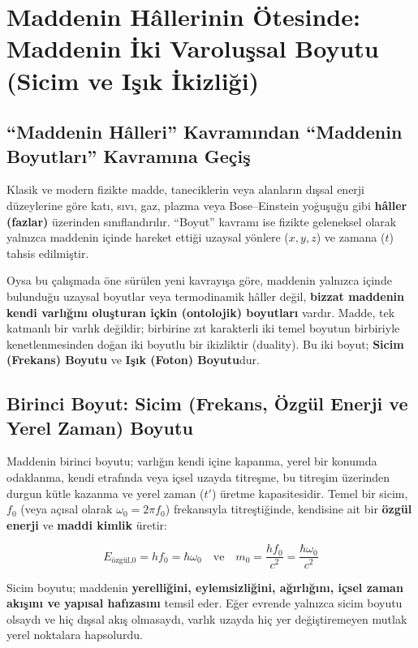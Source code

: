 \documentclass[12pt,a4paper]{article}
\begin{document}
\section{Maddenin Hâllerinin Ötesinde: Maddenin İki Varoluşsal Boyutu (Sicim ve Işık İkizliği)}

\subsection{``Maddenin Hâlleri'' Kavramından ``Maddenin Boyutları'' Kavramına Geçiş}

Klasik ve modern fizikte madde, taneciklerin veya alanların dışsal enerji düzeylerine göre katı, sıvı, gaz, plazma veya Bose--Einstein yoğuşuğu gibi \textbf{hâller (fazlar)} üzerinden sınıflandırılır. ``Boyut'' kavramı ise fizikte geleneksel olarak yalnızca maddenin içinde hareket ettiği uzaysal yönlere ($x, y, z$) ve zamana ($t$) tahsis edilmiştir.

Oysa bu çalışmada öne sürülen yeni kavrayışa göre, maddenin yalnızca içinde bulunduğu uzaysal boyutlar veya termodinamik hâller değil, \textbf{bizzat maddenin kendi varlığını oluşturan içkin (ontolojik) boyutları} vardır. Madde, tek katmanlı bir varlık değildir; birbirine zıt karakterli iki temel boyutun birbiriyle kenetlenmesinden doğan iki boyutlu bir ikizliktir (duality). Bu iki boyut; \textbf{Sicim (Frekans) Boyutu} ve \textbf{Işık (Foton) Boyutu}dur.

\subsection{Birinci Boyut: Sicim (Frekans, Özgül Enerji ve Yerel Zaman) Boyutu}

Maddenin birinci boyutu; varlığın kendi içine kapanma, yerel bir konumda odaklanma, kendi etrafında veya içsel uzayda titreşme, bu titreşim üzerinden durgun kütle kazanma ve yerel zaman ($t'$) üretme kapasitesidir. Temel bir sicim, $f_0$ (veya açısal olarak $\omega_0 = 2\pi f_0$) frekansıyla titreştiğinde, kendisine ait bir \textbf{özgül enerji} ve \textbf{maddi kimlik} üretir:

\begin{equation}
E_{\text{özgül,0}} = h f_0 = \hbar \omega_0 \quad \text{ve} \quad m_0 = \frac{h f_0}{c^2} = \frac{\hbar \omega_0}{c^2}
\end{equation}

Sicim boyutu; maddenin \textbf{yerelliğini, eylemsizliğini, ağırlığını, içsel zaman akışını ve yapısal hafızasını} temsil eder. Eğer evrende yalnızca sicim boyutu olsaydı ve hiç dışsal akış olmasaydı, varlık uzayda hiç yer değiştiremeyen mutlak yerel noktalara hapsolurdu.
\end{document}
